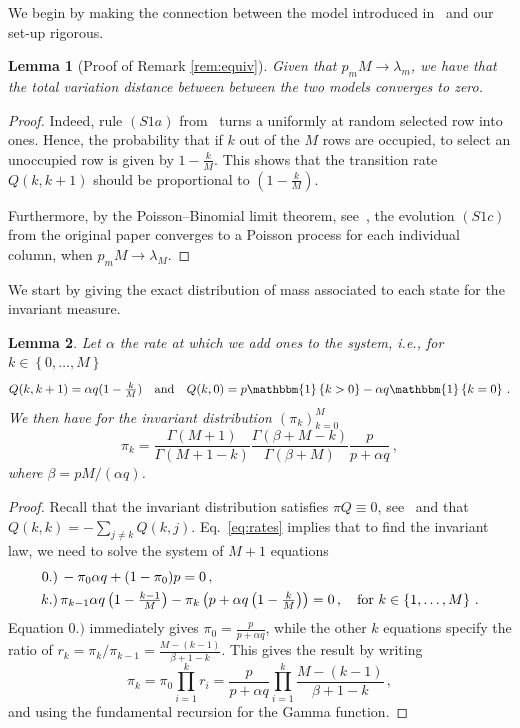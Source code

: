 \documentclass{article}
\numberwithin{equation}{section}
\newcommand{\gk}[1]{\left\{#1\right\}}
\newcommand{\rk}[1]{\left(#1\right)}
\newcommand{\1}{\mathbbm{1}}
\newtheorem{lemma}{Lemma}[section]
\begin{document}
We begin by making the connection between the model introduced in~\cite{kuehn2025mathematicalmodelsselfadaptiveresponse} and our set-up rigorous.
\begin{lemma}[Proof of Remark \ref{rem:equiv}]\label{lem:id}
    Given that $p_mM\to \lambda_m$, we have that the total variation distance between between the two models converges to zero. 
\end{lemma}
\begin{proof}
    Indeed, rule $(S1a)$ from~\cite{kuehn2025mathematicalmodelsselfadaptiveresponse} turns a uniformly at random selected row into ones. Hence, the probability that if $k$ out of the $M$ rows are occupied, to select an unoccupied row is given by $1-\tfrac{k}{M}$. This shows that the transition rate $Q(k, k+1)$ should be proportional to $(1-\tfrac{k}{M})$.
    
    Furthermore, by the Poisson--Binomial limit theorem, see~\cite{kallenberg1997foundations}, the evolution $(S1c)$ from the original paper converges to a Poisson process for each individual column, when $p_mM\to \lambda_M$.
\end{proof}
We start by giving the exact distribution of mass associated to each state for the invariant measure.
\begin{lemma}\label{lem:invardist}
    Let $\alpha$ the rate at which we add ones to the system, i.e.,  for $k\in \gk{0, \ldots,M}$
    \begin{equation}\label{eq:rates}
    Q(k,k+1)=\alpha q(1-\tfrac{k}{M})\quad\text{and}\quad Q(k,0)=p\1\gk{k>0}-\alpha q\1\gk{k=0}\, .
\end{equation}
We then have for the invariant distribution $\rk{\pi_k}_{k=0}^M$
\begin{equation}\label{eq:invariantDist}
    \pi_k=\frac{\Gamma(M+1)}{\Gamma(M+1-k)}\frac{\Gamma(\beta+ M-k)}{\Gamma(\beta+ M)}\frac{p}{p+\alpha q}\, ,
\end{equation}
where $\beta=pM/(\alpha q)$.
\end{lemma}
\begin{proof}
Recall that the invariant distribution satisfies $\pi Q\equiv 0$, see~\cite{liggett1985interacting} and that $Q(k,k)=-\sum_{j\neq k}Q(k,j)$. Eq.~\eqref{eq:rates} implies that to find the invariant law, we need to solve the system of $M+1$ equations
\begin{equation}
    \begin{split}
        \mathrm{0}.)&\, -\pi_0\alpha q+(1-\pi_0)p=0\, ,\\
        {k}.)&\, \pi_{k-1}\alpha q\rk{1-\tfrac{k-1}{M}}-\pi_k\rk{p+\alpha q\rk{1-\tfrac{k}{M}}}=0\, , \quad \textnormal{for }k\in \gk{1,\ldots, M}\, .
    \end{split}
\end{equation}
Equation $\mathrm{0}.)$ immediately gives $\pi_0=\tfrac{p}{p+\alpha q}$, while the other $k$ equations specify the ratio of $r_k=\pi_k/\pi_{k-1}=\tfrac{M-(k-1)}{\beta+1-k}$. This gives the result by writing
\begin{equation}
    \pi_k=\pi_0\prod_{i=1}^{k}r_i=\frac{p}{p+\alpha q}\prod_{i=1}^{k}\frac{M-(k-1)}{\beta+1-k}\, ,
\end{equation}
and using the fundamental recursion for the Gamma function.
\end{proof}
\end{document}
